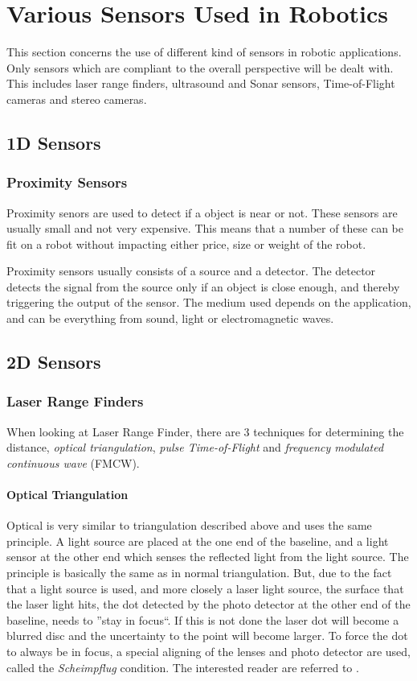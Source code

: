 \section{Various Sensors Used in Robotics}
This section concerns the use of different kind of sensors in robotic applications. Only
sensors which are compliant to the overall perspective will be dealt with. This includes
laser range finders, ultrasound and Sonar sensors, Time-of-Flight cameras and
stereo cameras. 


\subsection{1D Sensors}

\subsubsection{Proximity Sensors}
Proximity senors are used to detect if a object is near or not. These sensors are usually
small and not very expensive. This means that a number of these can be fit on a robot
without impacting either price, size or weight of the robot. 

Proximity sensors usually consists of a source and a detector. The detector detects the
signal from the source only if an object is close enough, and thereby triggering the
output of the sensor. The medium used depends on the application, and can be everything
from sound, light or electromagnetic waves. 
\cite{proximity}

\subsection{2D Sensors}

\subsubsection{Laser Range Finders}
When looking at Laser Range Finder, there are 3 techniques for determining the distance,
\emph{optical triangulation}, \emph{pulse Time-of-Flight} and \emph{frequency modulated
continuous wave} (FMCW). \cite{laser-ranging-critical-review}

\paragraph{Optical Triangulation}
Optical is very similar to triangulation described above and uses the same principle.
A light source are placed at the one end of the
baseline, and a light sensor at the other end which senses the reflected light from the
light source. The principle is basically the same as in normal triangulation. But, due to
the fact that a light source is used, and more closely a laser light source, the surface
that the laser light hits, the dot detected by the photo detector at the other end of the
baseline, needs to ''stay in focus``. If this is not done the laser dot will become a
blurred disc and the uncertainty to the point will become larger. To force the dot to
always be in focus, a special aligning of the lenses and photo detector are used, called 
the \emph{Scheimpflug} condition. The interested reader are referred to
\cite{laser-ranging-critical-review}.

